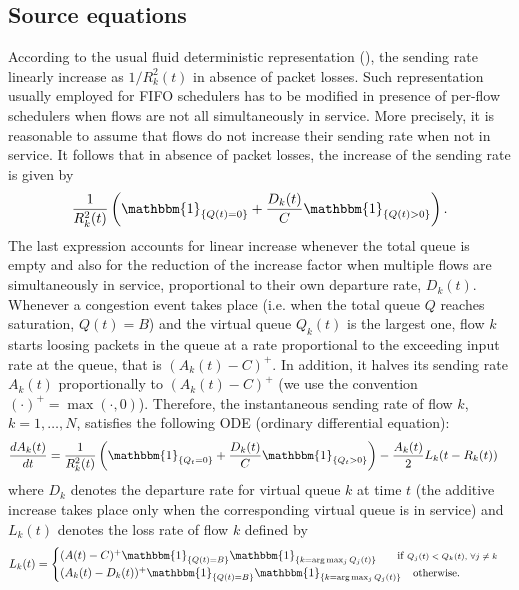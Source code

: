 \documentclass[a4paper,oneside, 11pt]{article}
\newcommand{\I}[1]{  \mathbbm{1}_{ \left\{  #1 \right\} }   }
\begin{document}
\subsection{Source equations}\label{subsec:sources}
According to the usual fluid deterministic representation
(\cite{ajmone,baccelli,carofiglioSplit}),
the sending rate linearly increase as $1/R^2_k(t)$ in absence of packet losses.
Such representation usually employed for FIFO schedulers has to be modified in presence of per-flow schedulers when flows are not all simultaneously in service.
More precisely, it is reasonable to assume that flows do not increase their sending rate when not in service. It follows that in absence of packet losses, the increase
of the sending rate is given by $$\frac{1}{R^2_k(t)} \left(\I{Q(t)=0}+\frac{D_k(t)}{C}\I{Q(t)>0}\right).$$
The last expression accounts for linear increase whenever the total queue is empty and also for the reduction of the increase factor when multiple flows are simultaneously in service, proportional to their own departure rate,
$D_k(t)$.\\
Whenever a congestion event takes place (i.e. when the total queue $Q$ reaches saturation, $Q(t)=B$) and the virtual queue $Q_k(t)$ is the largest one, flow $k$ starts loosing packets in the queue at a rate proportional to the exceeding input rate at the queue, that is $(A_k(t)-C)^+$.
In addition, it halves its sending rate $A_k(t)$ proportionally to $(A_k(t)-C)^+$ (we use the convention $(\cdot)^+=\max(\cdot,0)$).
Therefore, the instantaneous sending rate of flow $k$, $k=1,\dots,N$, satisfies the following ODE (ordinary differential equation):
\begin{align}\label{eqn:ODEsource}
&\frac{dA_k(t)}{dt}=\frac{1}{R^2_k(t)} \left(\I{Q_t=0}+
\frac{D_k(t)}{C}\I{Q_t>0}\right)
-\frac{A_k(t)}{2}L_k(t-R_k(t))
\end{align}
where
$D_k$  denotes the departure rate for virtual queue $k$ at time $t$ (the additive increase takes place only when the
corresponding virtual queue is in service) and
$L_k(t)$ denotes the loss rate of flow $k$ defined by\begin{align}\label{def:L}
 &L_k(t)=
\begin{cases}
(A(t)-C)^+\I{Q(t)=B}\I{k=\arg\max_{j} Q_j(t)} &\text{ \hspace{-6mm}\small{if }\scriptsize{$Q_j(t)<Q_k(t)$, $\forall j\neq k$}}\\
(A_k(t)-D_k(t))^+\I{Q(t)=B}\I{k=\arg\max_{j} Q_j(t)}&\text{\small{otherwise.}}
\end{cases}
\end{align}
\end{document}
